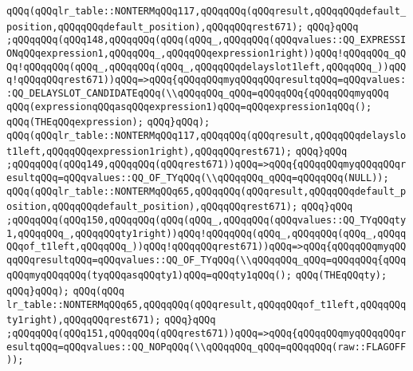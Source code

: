 \verb|qQQq(qQQqlr_table::NONTERMqQQq117,qQQqqQQq(qQQqresult,qQQqqQQqdefault_position,qQQqqQQqdefault_position),qQQqqQQqrest671);|\newline
\verb|qQQq}qQQq|\newline
\verb|;qQQqqQQq(qQQq148,qQQqqQQq(qQQq(qQQq_,qQQqqQQq(qQQqvalues::QQ_EXPRESSIONqQQqexpression1,qQQqqQQq_,qQQqqQQqexpression1right))qQQq!qQQqqQQq_qQQq!qQQqqQQq(qQQq_,qQQqqQQq(qQQq_,qQQqqQQqdelayslot1left,qQQqqQQq_))qQQq!qQQqqQQqrest671))qQQq=>qQQq{qQQqqQQqmyqQQqqQQqresultqQQq=qQQqvalues::QQ_DELAYSLOT_CANDIDATEqQQq(\\qQQqqQQq_qQQq=qQQqqQQq{qQQqqQQqmyqQQq|\newline
\verb|qQQq(expressionqQQqasqQQqexpression1)qQQq=qQQqexpression1qQQq();|\newline
\verb|qQQq(THEqQQqexpression);|\newline
\verb|qQQq}qQQq);|\newline
\verb|qQQq(qQQqlr_table::NONTERMqQQq117,qQQqqQQq(qQQqresult,qQQqqQQqdelayslot1left,qQQqqQQqexpression1right),qQQqqQQqrest671);|\newline
\verb|qQQq}qQQq|\newline
\verb|;qQQqqQQq(qQQq149,qQQqqQQq(qQQqrest671))qQQq=>qQQq{qQQqqQQqmyqQQqqQQqresultqQQq=qQQqvalues::QQ_OF_TYqQQq(\\qQQqqQQq_qQQq=qQQqqQQq(NULL));|\newline
\verb|qQQq(qQQqlr_table::NONTERMqQQq65,qQQqqQQq(qQQqresult,qQQqqQQqdefault_position,qQQqqQQqdefault_position),qQQqqQQqrest671);|\newline
\verb|qQQq}qQQq|\newline
\verb|;qQQqqQQq(qQQq150,qQQqqQQq(qQQq(qQQq_,qQQqqQQq(qQQqvalues::QQ_TYqQQqty1,qQQqqQQq_,qQQqqQQqty1right))qQQq!qQQqqQQq(qQQq_,qQQqqQQq(qQQq_,qQQqqQQqof_t1left,qQQqqQQq_))qQQq!qQQqqQQqrest671))qQQq=>qQQq{qQQqqQQqmyqQQqqQQqresultqQQq=qQQqvalues::QQ_OF_TYqQQq(\\qQQqqQQq_qQQq=qQQqqQQq{qQQqqQQqmyqQQqqQQq(tyqQQqasqQQqty1)qQQq=qQQqty1qQQq();|\newline
\verb|qQQq(THEqQQqty);|\newline
\verb|qQQq}qQQq);|\newline
\verb|qQQq(qQQq|\newline
\verb|lr_table::NONTERMqQQq65,qQQqqQQq(qQQqresult,qQQqqQQqof_t1left,qQQqqQQqty1right),qQQqqQQqrest671);|\newline
\verb|qQQq}qQQq|\newline
\verb|;qQQqqQQq(qQQq151,qQQqqQQq(qQQqrest671))qQQq=>qQQq{qQQqqQQqmyqQQqqQQqresultqQQq=qQQqvalues::QQ_NOPqQQq(\\qQQqqQQq_qQQq=qQQqqQQq(raw::FLAGOFF));|\newline
